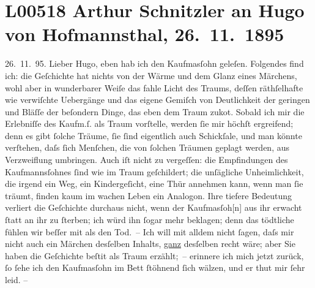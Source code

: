 

\section[Arthur Schnitzler an Hugo von Hofmannsthal, 26. 11. 1895]{L00518 Arthur Schnitzler an Hugo von Hofmannsthal, 26. 11. 1895}
\nopagebreak{}
\rehead{ }\normalsize\beginnumbering{}
\toendnotes[C]{\smallbreak\pagebreak[2]}
\toendnotes[C]{\smallbreak}
\pstart
           \raggedleft{}{\pb}26. 11. 95.\pend
           \vspace{0.5em}
\pstart
           Lieber Hugo, eben hab ich den Kaufma{\geminationn}sſohn geleſen. Folgendes find ich: die Geſchichte hat nichts von der
               Wärme und dem Glanz eines Märchens, wohl aber in wunderbarer Weiſe das fahle Licht
               des Traums, deſſen räthſelhafte wie verwiſchte Uebergänge und das eigene Gemiſch von
               Deutlichkeit der geringen und Bläſſe der beſondern Dinge, das eben dem Traum zuko{\geminationm}t. Sobald ich mir die Erlebniſſe des Kaufm.ſ. als Traum vorſtelle, werden ſie mir
               höchſt ergreifend; denn es gibt ſolche Träume, ſie ſind eigentlich auch Schickſale,
               und man könnte verſtehen, daſs ſich Menſchen, die von ſolchen Träumen geplagt {\pb}werden, aus Verzweiflung umbringen. Auch iſt nicht zu
               vergeſſen: die Empfindungen des Kaufmannsſohnes ſind wie im Traum geſchildert; die
               unſägliche Unheimlichkeit, die irgend ein Weg, ein Kindergeſicht, eine Thür annehmen
               kann, wenn man ſie träumt, finden kaum im wachen Leben ein Analogon. Ihre tiefere
               Bedeutung verliert die Geſchichte durchaus nicht, wenn der Kaufma{\geminationn}sſoh{[}n{]} aus ihr erwacht ſtatt an ihr zu ſterben; ich
               würd ihn ſogar mehr beklagen; denn das tödtliche fühlen wir beſſer mit als den Tod. –
               Ich will mit alldem {\pb}nicht ſagen, daſs mir \introOben{}nicht\introOben{} auch ein Märchen desſelben Inhalts, \uline{ganz} desſelben{ }recht wäre; aber Sie
               haben die Geſchichte beſti{\geminationm}t als Traum erzählt; – erinnere ich mich jetzt zurück,
               ſo ſehe ich den Kaufma{\geminationn}sſohn im Bett ſtöhnend ſich wälzen, und er thut mir ſehr leid.
               –\pend
           
